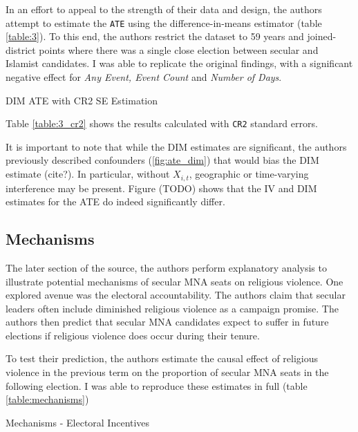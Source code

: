 \documentclass{scrartcl}
\begin{document}
In an effort to appeal to the strength of their data and design, the authors attempt to estimate the \texttt{ATE} using the difference-in-means estimator (table \ref{table:3}).
To this end, the authors restrict the dataset to 59 years and joined-district points where there was a single close election between secular and Islamist candidates. I was able to replicate the original findings, with a significant negative effect for \textit{Any Event, Event Count} and \textit{Number of Days}.


\begin{table}[ht]
  \begin{center}
    \scalebox{0.75}{
      
    }
    \caption{DIM ATE with CR2 SE Estimation}
    \label{table:3_cr2}
  \end{center}
\end{table}

Table \ref{table:3_cr2} shows the results calculated with \texttt{CR2} standard errors. 

It is important to note that while the DIM estimates are significant, the authors previously described confounders (\ref{fig:ate_dim}) that would bias the DIM estimate (cite?).
In particular, without $X_{i,t}$, geographic or time-varying interference may be present.
Figure (TODO) shows that the IV and DIM estimates for the ATE do indeed significantly differ. 


\subsection{Mechanisms}

The later section of the source, the authors perform explanatory analysis to illustrate potential mechanisms of secular MNA seats on religious violence. One explored avenue was the electoral accountability. The authors claim that secular leaders often include diminished religious violence as a campaign promise. The authors then predict that secular MNA candidates expect to suffer in future elections if religious violence does occur during their tenure. 

To test their prediction, the authors estimate the causal effect of religious violence in the previous term on the proportion of secular MNA seats in the following election.
I was able to reproduce these estimates in full (table \ref{table:mechanisms})

\begin{table}[ht]
  \begin{center}
    \scalebox{0.75}{
      
    }
    \caption{Mechanisms - Electoral Incentives}
    \label{table:mechanisms}
  \end{center}
\end{table}
\end{document}
